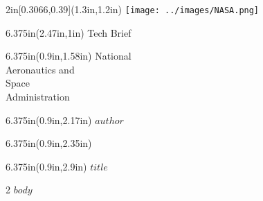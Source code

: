 \documentclass[$if(fontsize)$$fontsize$,$endif$$if(lang)$$lang$,$endif$]{$documentclass$}
\begin{document}
\begin{textblock*}{2in}[0.3066,0.39](1.3in,1.2in)
\texttt{[image: ../images/NASA.png]}
\end{textblock*}

\begin{textblock*}{6.375in}(2.47in,1in)
    \sffamily
	\fontsize{49pt}{0}
	\selectfont
	\setmainfont{Helvetica Light}
	Tech Brief
\end{textblock*}

\begin{textblock*}{6.375in}(0.9in,1.58in)
    \sffamily
	\fontsize{11pt}{0}
	\noindent
	\setmainfont{Helvetica Light}
	\selectfont National\\
    Aeronautics and\\
	Space\\
	Administration
\end{textblock*}

\begin{textblock*}{6.375in}(0.9in,2.17in)
    \sffamily
	\fontsize{14pt}{0}
	\noindent
	\setmainfont{Helvetica75-Bold}
    $author$
\end{textblock*}


\begin{textblock*}{6.375in}(0.9in,2.35in)
    \sffamily
	\fontsize{12pt}{0}
	\noindent
	\setmainfont{Helvetica Light}
\end{textblock*}


\begin{textblock*}{6.375in}(0.9in,2.9in)
	\noindent
	\fontsize{14pt}{0}
	\setmainfont{Helvetica75-Bold}
	$title$
\end{textblock*}

\vspace*{1.8in}

\begin{multicols}{2}
$body$

\end{multicols}
\end{document}
